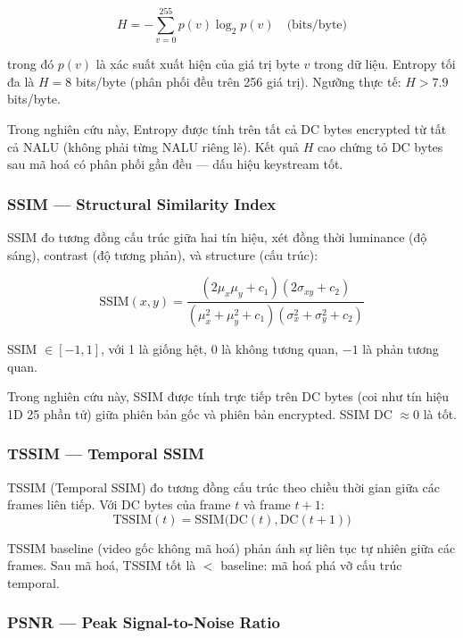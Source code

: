 \begin{equation}
H = -\sum_{v=0}^{255} p(v) \log_2 p(v) \quad \text{(bits/byte)}
\label{eq:entropy}
\end{equation}

trong đó $p(v)$ là xác suất xuất hiện của giá trị byte $v$ trong dữ liệu.
Entropy tối đa là $H = 8$ bits/byte (phân phối đều trên 256 giá trị).
Ngưỡng thực tế: $H > 7.9$ bits/byte.

Trong nghiên cứu này, Entropy được tính trên tất cả DC bytes encrypted từ tất cả
NALU (không phải từng NALU riêng lẻ). Kết quả $H$ cao chứng tỏ DC bytes sau mã hoá
có phân phối gần đều --- dấu hiệu keystream tốt.

\subsubsection{SSIM --- Structural Similarity Index}

SSIM \cite{wang_ssim} đo tương đồng cấu trúc giữa hai tín hiệu, xét đồng thời
luminance (độ sáng), contrast (độ tương phản), và structure (cấu trúc):

\begin{equation}
\text{SSIM}(x, y) = \frac{(2\mu_x\mu_y + c_1)(2\sigma_{xy} + c_2)}{(\mu_x^2 + \mu_y^2 + c_1)(\sigma_x^2 + \sigma_y^2 + c_2)}
\end{equation}

SSIM $\in [-1, 1]$, với 1 là giống hệt, 0 là không tương quan, $-1$ là phản tương quan.

Trong nghiên cứu này, SSIM được tính trực tiếp trên DC bytes (coi như tín hiệu 1D
25 phần tử) giữa phiên bản gốc và phiên bản encrypted. SSIM DC $\approx 0$ là tốt.

\subsubsection{TSSIM --- Temporal SSIM}

TSSIM (Temporal SSIM) đo tương đồng cấu trúc theo chiều thời gian giữa các frames
liên tiếp. Với DC bytes của frame $t$ và frame $t+1$:
\begin{equation}
\text{TSSIM}(t) = \text{SSIM}\bigl(\text{DC}(t), \text{DC}(t+1)\bigr)
\end{equation}

TSSIM baseline (video gốc không mã hoá) phản ánh sự liên tục tự nhiên giữa các frames.
Sau mã hoá, TSSIM tốt là $<$ baseline: mã hoá phá vỡ cấu trúc temporal.

\subsubsection{PSNR --- Peak Signal-to-Noise Ratio}

